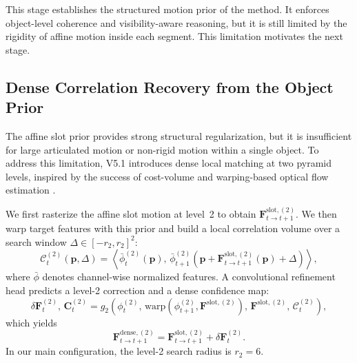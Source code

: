 This stage establishes the structured motion prior of the method. It enforces object-level coherence and visibility-aware reasoning, but it is still limited by the rigidity of affine motion inside each segment. This limitation motivates the next stage.

\subsection{Dense Correlation Recovery from the Object Prior}

The affine slot prior provides strong structural regularization, but it is insufficient for large articulated motion or non-rigid motion within a single object. To address this limitation, V5.1 introduces dense local matching at two pyramid levels, inspired by the success of cost-volume and warping-based optical flow estimation \cite{sun2018pwcnet,teed2020raft,huang2022flowformer}.

We first rasterize the affine slot motion at level~2 to obtain $\mathbf{F}^{\mathrm{slot},(2)}_{t\rightarrow t+1}$. We then warp target features with this prior and build a local correlation volume over a search window $\Delta \in [-r_2,r_2]^2$:
\begin{equation}
\label{eq:l2_corr}
\mathcal{C}_t^{(2)}(\mathbf{p},\Delta) = \left\langle \bar{\phi}_t^{(2)}(\mathbf{p}),\, \bar{\phi}_{t+1}^{(2)}\left(\mathbf{p} + \mathbf{F}^{\mathrm{slot},(2)}_{t\rightarrow t+1}(\mathbf{p}) + \Delta\right) \right\rangle,
\end{equation}
where $\bar{\phi}$ denotes channel-wise normalized features. A convolutional refinement head predicts a level-2 correction and a dense confidence map:
\begin{equation}
\delta \mathbf{F}_t^{(2)},\, \mathbf{C}_t^{(2)} = g_2\left(\phi_t^{(2)},\, \mathrm{warp}(\phi_{t+1}^{(2)},\mathbf{F}^{\mathrm{slot},(2)}),\, \mathbf{F}^{\mathrm{slot},(2)},\, \mathcal{C}_t^{(2)}\right),
\end{equation}
which yields
\begin{equation}
\mathbf{F}^{\mathrm{dense},(2)}_{t\rightarrow t+1} = \mathbf{F}^{\mathrm{slot},(2)}_{t\rightarrow t+1} + \delta \mathbf{F}_t^{(2)}.
\end{equation}
In our main configuration, the level-2 search radius is $r_2=6$.

